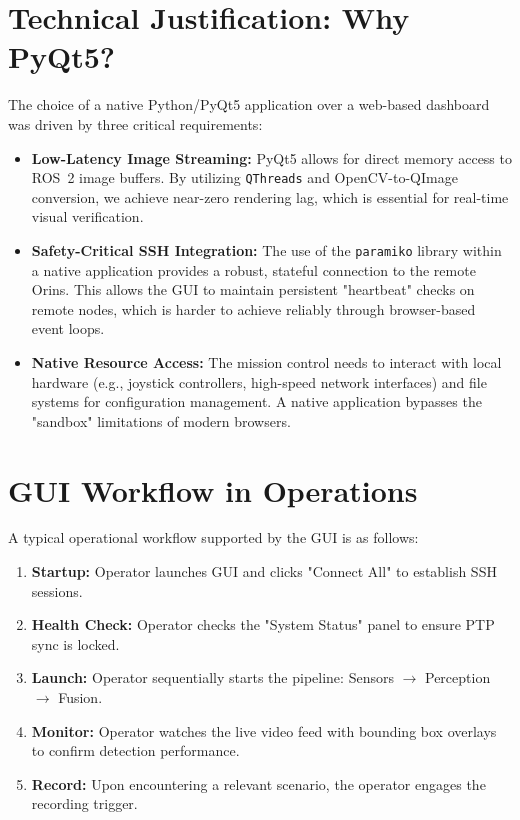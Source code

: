 \documentclass[12pt,a4paper]{report}
\begin{document}
\section{Technical Justification: Why PyQt5?}
The choice of a native Python/PyQt5 application over a web-based dashboard was driven by three critical requirements:
\begin{itemize}
    \item \textbf{Low-Latency Image Streaming:} PyQt5 allows for direct memory access to ROS~2 image buffers. By utilizing \texttt{QThreads} and OpenCV-to-QImage conversion, we achieve near-zero rendering lag, which is essential for real-time visual verification.
    \item \textbf{Safety-Critical SSH Integration:} The use of the \texttt{paramiko} library within a native application provides a robust, stateful connection to the remote Orins. This allows the GUI to maintain persistent "heartbeat" checks on remote nodes, which is harder to achieve reliably through browser-based event loops.
    \item \textbf{Native Resource Access:} The mission control needs to interact with local hardware (e.g., joystick controllers, high-speed network interfaces) and file systems for configuration management. A native application bypasses the "sandbox" limitations of modern browsers.
\end{itemize}

\section{GUI Workflow in Operations}
A typical operational workflow supported by the GUI is as follows:
\begin{enumerate}
    \item \textbf{Startup:} Operator launches GUI and clicks "Connect All" to establish SSH sessions.
    \item \textbf{Health Check:} Operator checks the "System Status" panel to ensure PTP sync is locked.
    \item \textbf{Launch:} Operator sequentially starts the pipeline: Sensors $\rightarrow$ Perception $\rightarrow$ Fusion.
    \item \textbf{Monitor:} Operator watches the live video feed with bounding box overlays to confirm detection performance.
    \item \textbf{Record:} Upon encountering a relevant scenario, the operator engages the recording trigger.
\end{enumerate}
\end{document}
